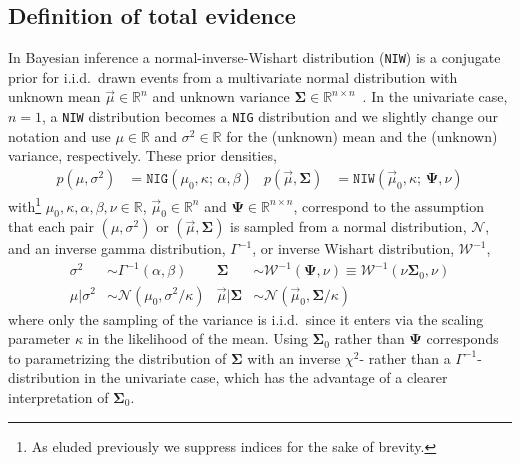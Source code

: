 \documentclass{article}
\begin{document}
\subsection{Definition of total evidence}
In Bayesian inference a normal-inverse-Wishart distribution (\texttt{NIW}) is a conjugate prior for i.i.d.\ drawn events from a multivariate normal distribution with unknown mean $\vec{\mu} \in \mathbb{R}^n$ and unknown variance $\bm{\Sigma} \in \mathbb{R}^{n \times n}$~\cite{gelman04}.
In the univariate case, $n=1$, a \texttt{NIW} distribution becomes a \texttt{NIG} distribution and we slightly change our notation and use $\mu \in \mathbb{R}$ and $\sigma^2 \in \mathbb{R}$ for the (unknown) mean and the (unknown) variance, respectively.
These prior densities,
\begin{align}
    p(\mu, \sigma^2) &= \texttt{NIG}(\mu_0, \kappa;\, \alpha, \beta) &
    p(\vec{\mu}, \bm{\Sigma}) &= \texttt{NIW}(\vec{\mu}_0, \kappa;\, \bm{\Psi}, \nu)
\end{align}
with\footnote{As eluded previously we suppress indices for the sake of brevity.} $\mu_0, \kappa, \alpha, \beta, \nu \in \mathbb{R}$, $\vec{\mu}_0 \in \mathbb{R}^n$ and $\bm{\Psi} \in \mathbb{R}^{n \times n}$, correspond to the assumption that each pair $(\mu, \sigma^2)$ or $(\vec{\mu}, \bm{\Sigma})$ is sampled from a normal distribution, $\mathcal{N}$, and an inverse gamma distribution, $\Gamma^{-1}$, or inverse Wishart distribution, $\mathcal{W}^{-1}$,
\begin{subequations}
    \begin{align}
        \sigma^2 &\sim \Gamma^{-1}(\alpha, \beta) &
        \bm{\Sigma} &\sim \mathcal{W}^{-1}(\bm{\Psi}, \nu) \equiv \mathcal{W}^{-1}(\nu \bm{\Sigma}_0, \nu) \\
        \mu | \sigma^2 &\sim \mathcal{N}(\mu_0, \sigma^2 / \kappa) &
        \vec{\mu} | \bm{\Sigma} &\sim \mathcal{N}(\vec{\mu}_0, \bm{\Sigma} / \kappa)
    \end{align}
\end{subequations}
where only the sampling of the variance is i.i.d.\ since it enters via the scaling parameter $\kappa$ in the likelihood of the mean.
Using $\bm{\Sigma}_0$ rather than $\bm{\Psi}$ corresponds to parametrizing the distribution of $\bm{\Sigma}$ with an inverse $\chi^2$- rather than a $\Gamma^{-1}$-distribution in the univariate case, which has the advantage of a clearer interpretation of $\bm{\Sigma}_0$.
\end{document}
